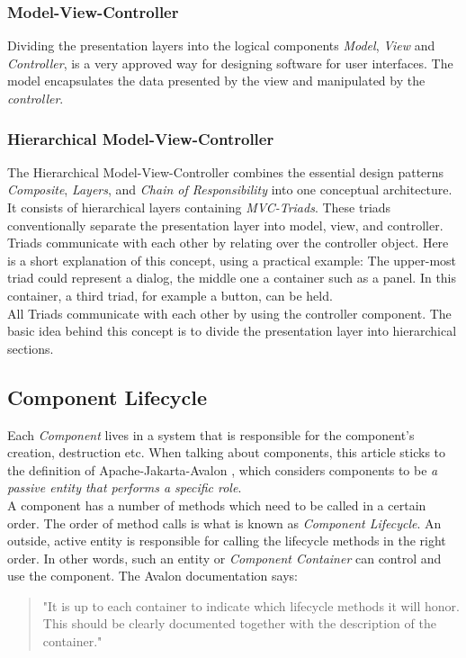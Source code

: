 \subsubsection{Model-View-Controller}
Dividing the presentation layers into the logical components \emph{Model},
\emph{View} and \emph{Controller}, is a very approved way for designing software
for user interfaces. The model encapsulates the data presented by the view and
manipulated by the \emph{controller}.

\subsubsection{Hierarchical Model-View-Controller \cite{hmvc}}
The Hierarchical Model-View-Controller combines the essential design patterns
\emph{Composite}, \emph{Layers}, and \emph{Chain of Responsibility} into
one conceptual architecture. It consists of hierarchical layers containing
\emph{MVC-Triads}. These triads conventionally separate the presentation layer
into model, view, and controller. Triads communicate with each other by
relating over the controller object. Here is a short explanation of this
concept, using a practical example: The upper-most triad could represent
a dialog, the middle one a container such as a panel. In this container,
a third triad, for example a button, can be held.\\
All Triads communicate with each other by using the controller component.
The basic idea behind this concept is to divide the presentation layer
into hierarchical sections.

\subsection{Component Lifecycle \cite{avalon}}

Each \emph{Component} lives in a system that is responsible for the component's
creation, destruction etc. When talking about components, this article sticks
to the definition of Apache-Jakarta-Avalon \cite{avalon}, which considers
components to be \emph{a passive entity that performs a specific role}.\\
A component has a number of methods which need to be called in a certain order.
The order of method calls is what is known as \emph{Component Lifecycle}.
An outside, active entity is responsible for calling the lifecycle methods
in the right order. In other words, such an entity or \emph{Component Container}
can control and use the component. The Avalon documentation \cite{avalon} says:

\begin{quotation}
"It is up to each container to indicate which lifecycle methods it will honor.
This should be clearly documented together with the description of the container."
\end{quotation}
